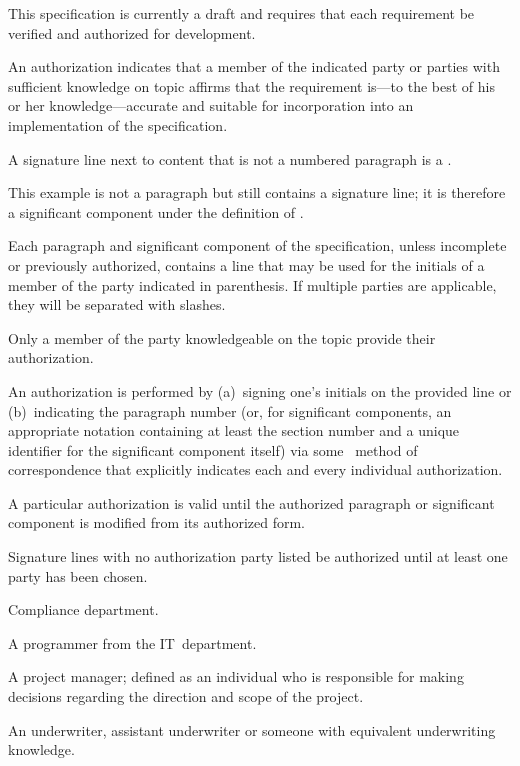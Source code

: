 

\label{authorize}

This specification is currently a draft and requires that each requirement be
verified and authorized for development.

An authorization indicates that a member of the indicated party or parties with
sufficient knowledge on topic affirms that the requirement is---to the best of
his or her knowledge---accurate and suitable for incorporation into an
implementation of the specification.

 A signature line next to content that is not a numbered paragraph
is a .

\begin{ex}
  \signline
  This example is not a paragraph but still contains a signature line; it is
  therefore a significant component under the definition of .
\end{ex}

Each paragraph and significant component of the specification, unless incomplete
or previously authorized, contains a line that may be used for the initials of a
member of the party indicated in parenthesis. If multiple parties are
applicable, they will be separated with slashes.

Only a member of the party knowledgeable on the topic \shall provide their
authorization.

An authorization is performed by (a)~signing one's initials on the provided line
or (b)~indicating the paragraph number (or, for significant components, an
appropriate notation containing at least the section number and a unique
identifier for the significant component itself) via some \unspecified\ method
of correspondence that explicitly indicates each and every individual
authorization.

A particular authorization is valid until the authorized paragraph or significant
component is modified from its authorized form.

Signature lines with no authorization party listed \shallnot be authorized until
at least one party has been chosen.

\goodbreak
\begin{description}
  Compliance department.

  A programmer from the IT~department.

  A project manager; defined as an individual who is responsible for making
  decisions regarding the direction and scope of the project.

  An underwriter, assistant underwriter or someone with equivalent underwriting
  knowledge.
\end{description}


\enddeptgroup
